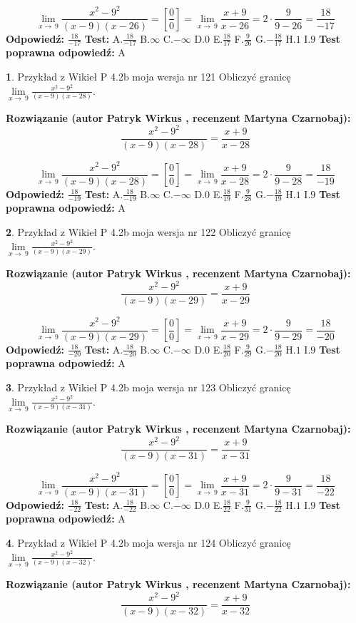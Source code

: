 \documentclass[12pt, a4paper]{article}
\theoremstyle{definition} %
\newtheorem{zad}{}
\newcommand{\zadStart}[1]{\begin{zad}#1\newline}
\newcommand{\zadStop}{\end{zad}}
\newcommand{\rozwStart}[2]{\noindent \textbf{Rozwiązanie (autor #1 , recenzent #2): }\newline}
\newcommand{\rozwStop}{\newline}
\newcommand{\odpStart}{\noindent \textbf{Odpowiedź:}\newline}
\newcommand{\odpStop}{\newline}
\newcommand{\testStart}{\noindent \textbf{Test:}\newline}
\newcommand{\testStop}{\newline}
\newcommand{\kluczStart}{\noindent \textbf{Test poprawna odpowiedź:}\newline}
\newcommand{\kluczStop}{\newline}
\begin{document}
$$\lim\limits_{x\to\ 9}\frac{x^{2}-9^{2}}{(x-9)(x-26)}=[\frac{0}{0}]=\lim\limits_{x\to\ 9}\frac{x+9}{x-26}=2 \cdot \frac{9}{9-26} = \frac{18}{-17}$$
\rozwStop
\odpStart
$\frac{18}{-17}$
\odpStop
\testStart
A.$\frac{18}{-17}$
B.$\infty$
C.$-\infty$
D.$0$
E.$\frac{18}{17}$
F.$\frac{9}{26}$
G.$-\frac{18}{17}$
H.$1$
I.$9$
\testStop
\kluczStart
A
\kluczStop



\zadStart{Przykład z Wikieł P 4.2b moja wersja nr 121}
Obliczyć granicę $\lim\limits_{x\to\ 9}\frac{x^{2}-9^{2}}{(x-9)(x-28)}$.
\zadStop
\rozwStart{Patryk Wirkus}{Martyna Czarnobaj}
$$\frac{x^{2}-9^{2}}{(x-9)(x-28)}=\frac{x+9}{x-28}$$

$$\lim\limits_{x\to\ 9}\frac{x^{2}-9^{2}}{(x-9)(x-28)}=[\frac{0}{0}]=\lim\limits_{x\to\ 9}\frac{x+9}{x-28}=2 \cdot \frac{9}{9-28} = \frac{18}{-19}$$
\rozwStop
\odpStart
$\frac{18}{-19}$
\odpStop
\testStart
A.$\frac{18}{-19}$
B.$\infty$
C.$-\infty$
D.$0$
E.$\frac{18}{19}$
F.$\frac{9}{28}$
G.$-\frac{18}{19}$
H.$1$
I.$9$
\testStop
\kluczStart
A
\kluczStop



\zadStart{Przykład z Wikieł P 4.2b moja wersja nr 122}
Obliczyć granicę $\lim\limits_{x\to\ 9}\frac{x^{2}-9^{2}}{(x-9)(x-29)}$.
\zadStop
\rozwStart{Patryk Wirkus}{Martyna Czarnobaj}
$$\frac{x^{2}-9^{2}}{(x-9)(x-29)}=\frac{x+9}{x-29}$$

$$\lim\limits_{x\to\ 9}\frac{x^{2}-9^{2}}{(x-9)(x-29)}=[\frac{0}{0}]=\lim\limits_{x\to\ 9}\frac{x+9}{x-29}=2 \cdot \frac{9}{9-29} = \frac{18}{-20}$$
\rozwStop
\odpStart
$\frac{18}{-20}$
\odpStop
\testStart
A.$\frac{18}{-20}$
B.$\infty$
C.$-\infty$
D.$0$
E.$\frac{18}{20}$
F.$\frac{9}{29}$
G.$-\frac{18}{20}$
H.$1$
I.$9$
\testStop
\kluczStart
A
\kluczStop



\zadStart{Przykład z Wikieł P 4.2b moja wersja nr 123}
Obliczyć granicę $\lim\limits_{x\to\ 9}\frac{x^{2}-9^{2}}{(x-9)(x-31)}$.
\zadStop
\rozwStart{Patryk Wirkus}{Martyna Czarnobaj}
$$\frac{x^{2}-9^{2}}{(x-9)(x-31)}=\frac{x+9}{x-31}$$

$$\lim\limits_{x\to\ 9}\frac{x^{2}-9^{2}}{(x-9)(x-31)}=[\frac{0}{0}]=\lim\limits_{x\to\ 9}\frac{x+9}{x-31}=2 \cdot \frac{9}{9-31} = \frac{18}{-22}$$
\rozwStop
\odpStart
$\frac{18}{-22}$
\odpStop
\testStart
A.$\frac{18}{-22}$
B.$\infty$
C.$-\infty$
D.$0$
E.$\frac{18}{22}$
F.$\frac{9}{31}$
G.$-\frac{18}{22}$
H.$1$
I.$9$
\testStop
\kluczStart
A
\kluczStop



\zadStart{Przykład z Wikieł P 4.2b moja wersja nr 124}
Obliczyć granicę $\lim\limits_{x\to\ 9}\frac{x^{2}-9^{2}}{(x-9)(x-32)}$.
\zadStop
\rozwStart{Patryk Wirkus}{Martyna Czarnobaj}
$$\frac{x^{2}-9^{2}}{(x-9)(x-32)}=\frac{x+9}{x-32}$$
\end{document}
